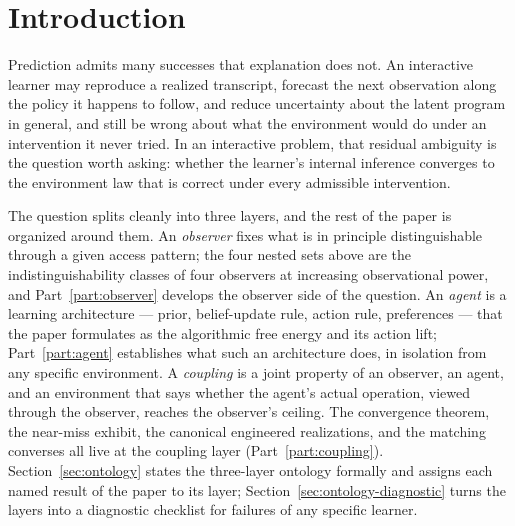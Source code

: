 \documentclass[11pt]{article}
\theoremstyle{definition}
\theoremstyle{remark}
\begin{document}
\section{Introduction}
\label{sec:intro}

Prediction admits many successes that explanation does not. An interactive learner may reproduce a realized transcript, forecast the next observation along the policy it happens to follow, and reduce uncertainty about the latent program in general, and still be wrong about what the environment would do under an intervention it never tried. In an interactive problem, that residual ambiguity is the question worth asking: whether the learner's internal inference converges to the environment law that is correct under every admissible intervention.

The question splits cleanly into three layers, and the rest of the paper is organized around them. An \emph{observer} fixes what is in principle distinguishable through a given access pattern; the four nested sets above are the indistinguishability classes of four observers at increasing observational power, and Part~\ref{part:observer} develops the observer side of the question. An \emph{agent} is a learning architecture --- prior, belief-update rule, action rule, preferences --- that the paper formulates as the algorithmic free energy and its action lift; Part~\ref{part:agent} establishes what such an architecture does, in isolation from any specific environment. A \emph{coupling} is a joint property of an observer, an agent, and an environment that says whether the agent's actual operation, viewed through the observer, reaches the observer's ceiling. The convergence theorem, the near-miss exhibit, the canonical engineered realizations, and the matching converses all live at the coupling layer (Part~\ref{part:coupling}). Section~\ref{sec:ontology} states the three-layer ontology formally and assigns each named result of the paper to its layer; Section~\ref{sec:ontology-diagnostic} turns the layers into a diagnostic checklist for failures of any specific learner.
\end{document}
